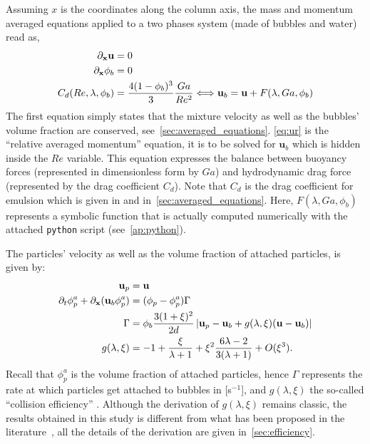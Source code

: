 Assuming $x$ is the coordinates along the column axis, the mass and momentum averaged equations applied to a two phases system (made of bubbles and water) read as, 
\begin{align}
    \label{eq:divu_zero}
    \pddx \textbf{u} &= 0 \\
    \pddx \phi_b &= 0 \\
    \label{eq:ur}
    C_d(Re,\lambda,\phi_b) &= \frac{4(1-\phi_b)^3}{3}\frac{Ga}{Re^2} \Longleftrightarrow  \textbf{u}_b = \textbf{u}  + F(\lambda , Ga, \phi_b)
\end{align}
The first equation simply states that the mixture velocity as well as the bubbles' volume fraction are conserved, see~\ref{sec:averaged_equations}. 
\ref{eq:ur} is the ``relative averaged momentum'' equation, it is to be solved for $\textbf{u}_b$ which is hidden inside the $Re$ variable. 
This equation expresses the balance between buoyancy forces (represented in dimensionless form by $Ga$) and hydrodynamic drag force (represented by the drag coefficient $C_d$). 
Note that $C_d$ is the drag coefficient for emulsion which is given in \citet[Chapter 8]{fintzi2025} and in~\ref{sec:averaged_equations}.
Here, $F(\lambda,Ga,\phi_b)$ represents a symbolic function that is actually computed numerically with the attached \texttt{python} script (see~\ref{ap:python}). 

The particles' velocity as well as the volume fraction of attached particles, is given by:
\begin{align}
    \textbf{u}_p &= \textbf{u}\\
    \pddt \phi_p^a  + \pddx (\textbf{u}_b \phi_p^a)
    &= 
    (\phi_p - \phi_p^a) \Gamma
    \label{eq:kinetic_summary}
    \\
    \Gamma &= \phi_b \frac{3(1+\xi)^2 }{2d}
    \left|\textbf{u}_p  - \textbf{u}_b + g(\lambda,\xi) (\textbf{u} - \textbf{u}_b)\right|\\
    g(\lambda,\xi)
    &=
    -1+\frac{\xi}{\lambda + 1} + \xi^2  \frac{6\lambda - 2}{3(\lambda+1)}
    + O(\xi^3).
\end{align}
Recall that $\phi_p^a$ is the volume fraction of attached particles, hence $\Gamma$ represents the rate at which particles get attached to bubbles in [s$^{-1}$], and $g(\lambda,\xi)$ the so-called ``collision efficiency'' \citep{loewenberg1994flotation}.
Although the derivation of $g(\lambda,\xi)$ remains classic, the results obtained in this study is different from what has been proposed in the literature~\citep{loewenberg1994flotation}, all the details of the derivation are given in~\ref{sec:efficiency}. 

